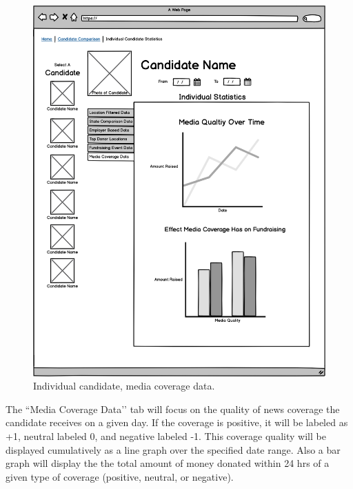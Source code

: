 \documentclass[12pt]{article}
\begin{document}
    \begin{figure}[H]
        \begin{center}
        \includegraphics[scale=.30]{candidatemedia}
        \caption{Individual candidate, media coverage data.}
        \label{fig:13}
        \end{center}
    \end{figure}
    The ``Media Coverage Data’’ tab will focus on the quality of news coverage the candidate receives on a given day. If the coverage is positive, it will be labeled as +1, neutral labeled 0, and negative labeled -1. This coverage quality will be displayed cumulatively as a line graph over the specified date range. Also a bar graph will display the the total amount of money donated within 24 hrs of a given type of coverage (positive, neutral, or negative).
\end{document}
